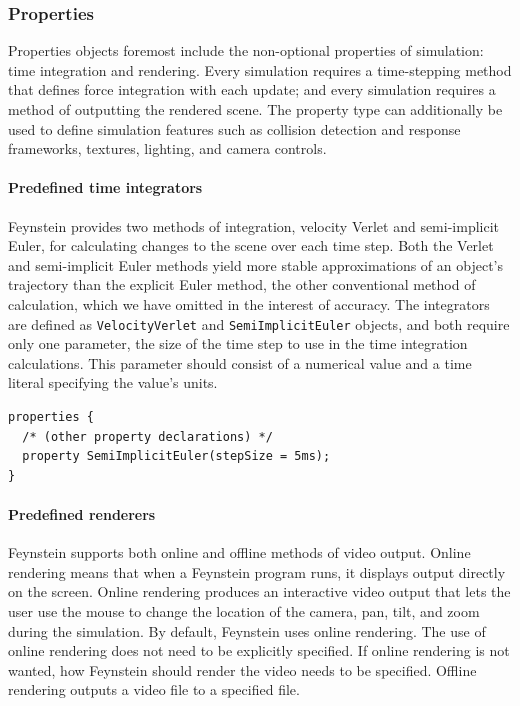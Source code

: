 \subsubsection{Properties}
Properties objects foremost include the non-optional properties of
simulation: time integration and rendering. Every simulation requires
a time-stepping method that defines force integration with each
update; and every simulation requires a method of outputting the
rendered scene. The property type can additionally be used to define
simulation features such as collision detection and response
frameworks, textures, lighting, and camera controls.

\paragraph{Predefined time integrators}

Feynstein provides two methods of integration, velocity Verlet and
semi-implicit Euler, for calculating changes to the scene over each
time step. Both the Verlet and semi-implicit Euler methods yield
more stable approximations of an object's trajectory than the explicit
Euler method, the other conventional method of calculation, which we
have omitted in the interest of accuracy. The integrators are defined
as \texttt{VelocityVerlet} and \texttt{SemiImplicitEuler} objects, and both require
only one parameter, the size of the time step to use in the time
integration calculations. This parameter should consist of a numerical
value and a time literal specifying the value's units.

\begin{verbatim}
properties {
  /* (other property declarations) */
  property SemiImplicitEuler(stepSize = 5ms);
}
\end{verbatim}

\paragraph{Predefined renderers}

Feynstein supports both online and offline methods of video output.
Online rendering means that when a Feynstein program runs, it displays
output directly on the screen. Online rendering produces an
interactive video output that lets the user use the mouse to change
the location of the camera, pan, tilt, and zoom during the
simulation. By default, Feynstein uses online rendering.  The use of
online rendering does not need to be explicitly specified.  If online
rendering is not wanted, how Feynstein should render the video needs
to be specified.  Offline rendering outputs a video file to a
specified file.

